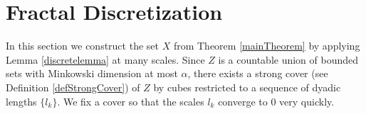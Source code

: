 \documentclass[dvipsnames,letterpaper,12pt]{article}
\numberwithin{equation}{section}
\theoremstyle{plain}
\theoremstyle{remark}
\begin{document}
\section{Fractal Discretization}\label{discretizationsection}

In this section we construct the set $X$ from Theorem \ref{mainTheorem} by applying Lemma \ref{discretelemma} at many scales. Since $Z$ is a countable union of bounded sets with Minkowski dimension at most $\alpha$, there exists a strong cover (see Definition \ref{defStrongCover}) of $Z$ by cubes restricted to a sequence of dyadic lengths $\{ l_k \}$. We fix a cover so that the scales $l_k$ converge to $0$ very quickly.
\end{document}
